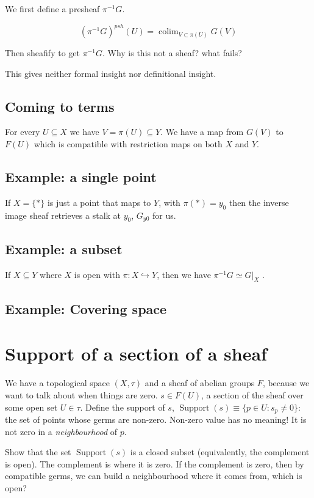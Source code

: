 \documentclass{book}
\newcommand{\colim}{\operatorname{colim}}
\newcommand{\inv}{\ensuremath{-1}}
\newcommand{\piinv}{\ensuremath{\pi^\inv}}
\newcommand{\supp}{\operatorname{Support}}
\theoremstyle{definition}
\begin{document}
We first define a presheaf $\piinv G$. 


$$
(\piinv G)^{psh}(U) = \colim_{V \subset \pi(U)} G(V)
$$

Then sheafify to get $\piinv G$. Why is this not a sheaf? what fails?

This gives neither formal insight nor definitional insight.

\subsection{Coming to terms}

For every $U \subseteq X$ we have $V=\pi(U) \subseteq Y$. We have a map
from $G(V)$ to $F(U)$ which is compatible with restriction maps on both
$X$ and $Y$.

\subsection{Example: a single point}

If $X = \{*\}$ is just a point that maps to $Y$, with $\pi(*) = y_0$ 
then the inverse image sheaf retrieves a stalk at $y_0$, $G_{y0}$ for us.

\subsection{Example: a subset}

If $X \subseteq Y$ where $X$ is open with $\pi: X \hookrightarrow Y$,
then we have $\piinv G \simeq G|_X$ .

\subsection{Example: Covering space}

\section{Support of a section of a sheaf}

We have a topological space $(X, \tau)$ and a sheaf of abelian groups $F$,
because we want to talk about when things are zero. $s \in F(U)$, a section
of the sheaf over some open set $U \in \tau$. Define the support of $s$,
$\supp(s) \equiv \{ p \in U: s_p \neq 0 \}$: the set of points whose
germs are non-zero. Non-zero value has no meaning! It is not zero in a 
\emph{neighbourhood} of $p$.

Show that the set $\supp(s)$ is a closed subset (equivalently, the complement is open).
The complement is where it is zero. If the complement is zero, then by compatible
germs, we can build a neighbourhood where it comes from, which is open?
\end{document}
